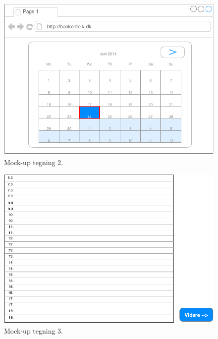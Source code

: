 \documentclass[12pt]{article}   %
\begin{document}
\begin{figure}[!ht]
\begin{center}
\includegraphics{mock2.pdf}
\caption{Mock-up tegning 2.}
\end{center}
\end{figure}


\newpage

\begin{figure}[!ht]
\begin{center}
\includegraphics{mock3.pdf}
\caption{Mock-up tegning 3.}
\end{center}
\end{figure}


\newpage
\end{document}
